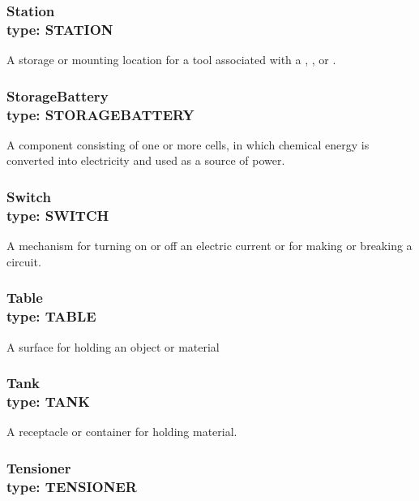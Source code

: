 \subsubsection[Station]{Station \\ {\small type: STATION}}
\label{sec:Station}



A storage or mounting location for a tool associated with a , , or .


\subsubsection[StorageBattery]{StorageBattery \\ {\small type: STORAGE\textunderscore BATTERY}}
\label{sec:StorageBattery}



A component consisting of one or more cells, in which chemical energy is converted into electricity and used as a source of power. 


\subsubsection[Switch]{Switch \\ {\small type: SWITCH}}
\label{sec:Switch}



A mechanism for turning on or off an electric current or for making or breaking a circuit.


\subsubsection[Table]{Table \\ {\small type: TABLE}}




A surface for holding an object or material


\subsubsection[Tank]{Tank \\ {\small type: TANK}}
\label{sec:Tank}



A receptacle or container for holding material.


\subsubsection[Tensioner]{Tensioner \\ {\small type: TENSIONER}}
\label{sec:Tensioner}



